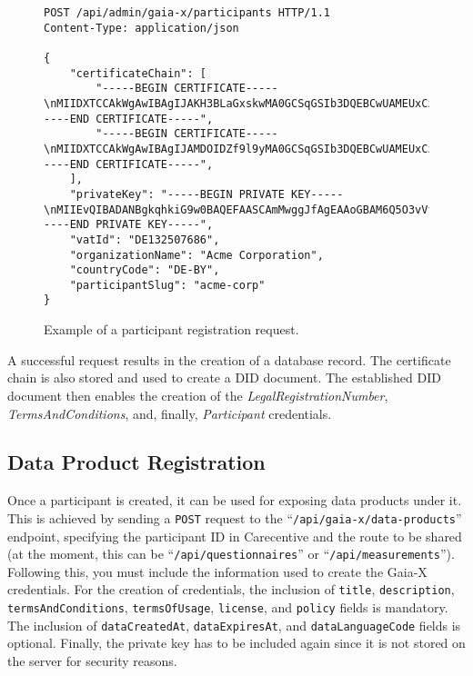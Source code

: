 \begin{figure}[h]
    \centering
    \begin{verbatim}
POST /api/admin/gaia-x/participants HTTP/1.1
Content-Type: application/json

{
	"certificateChain": [
		"-----BEGIN CERTIFICATE-----\nMIIDXTCCAkWgAwIBAgIJAKH3BLaGxskwMA0GCSqGSIb3DQEBCwUAMEUxCzAJBgNV\n...\nJmCVzwB/MCuv3z4IV0IsbP5ZKh+6m0oI+RINdDl4Stxdj6LK8JspNeU0R6mBg1A=\n-----END CERTIFICATE-----",
		"-----BEGIN CERTIFICATE-----\nMIIDXTCCAkWgAwIBAgIJAMDOIDZf9l9yMA0GCSqGSIb3DQEBCwUAMEUxCzAJBgNV\n...\nv5pXVIlZm8DtRmDTUp8pNDnQ5UAZTuDPaWo3zbxZPOUmGJ1IlBOgaQvsyPCW5gU=\n-----END CERTIFICATE-----",
	],
	"privateKey": "-----BEGIN PRIVATE KEY-----\nMIIEvQIBADANBgkqhkiG9w0BAQEFAASCAmMwggJfAgEAAoGBAM6Q5O3vVfnxk6P7\n...\nYWw+HiFJh9XQpRUtv9PV8L8AqFFfMdsOpT6pgC+aA/WB\n-----END PRIVATE KEY-----",
	"vatId": "DE132507686",
	"organizationName": "Acme Corporation",
	"countryCode": "DE-BY",
	"participantSlug": "acme-corp"
}
    \end{verbatim}
    \caption{Example of a participant registration request.}\label{fig:participant_req}
\end{figure}

A successful request results in the creation of a database record.
The certificate chain is also stored and used to create a DID document.
The established DID document then enables the creation of the \textit{LegalRegistrationNumber}, \textit{TermsAndConditions}, and, finally, \textit{Participant} credentials.

\subsection{Data Product Registration}\label{subsec:data-product-registration}

Once a participant is created, it can be used for exposing data products under it.
This is achieved by sending a \texttt{POST} request to the ``\texttt{/api/gaia-x/data-products}'' endpoint, specifying the participant ID in Carecentive and the route to be shared (at the moment, this can be ``\texttt{/api/questionnaires}'' or ``\texttt{/api/measurements}'').
Following this, you must include the information used to create the Gaia-X credentials.
For the creation of credentials, the inclusion of \texttt{title}, \texttt{description}, \texttt{termsAndConditions}, \texttt{termsOfUsage}, \texttt{license}, and \texttt{policy} fields is mandatory.
The inclusion of \texttt{dataCreatedAt}, \texttt{dataExpiresAt}, and \texttt{dataLanguageCode} fields is optional.
Finally, the private key has to be included again since it is not stored on the server for security reasons.

